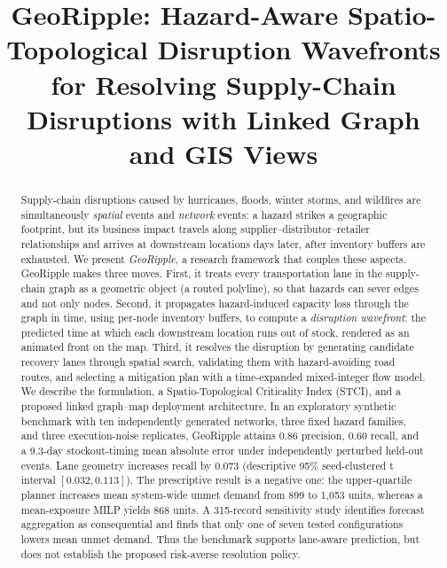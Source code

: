 \documentclass[conference]{IEEEtran}
\begin{document}
\title{GeoRipple: Hazard-Aware Spatio-Topological Disruption Wavefronts
for Resolving Supply-Chain Disruptions with Linked Graph and GIS Views}

\author{}

\maketitle

\begin{abstract}
Supply-chain disruptions caused by hurricanes, floods, winter storms, and
wildfires are simultaneously \emph{spatial} events and \emph{network}
events: a hazard strikes a geographic footprint, but its business impact
travels along supplier--distributor--retailer relationships and arrives at
downstream locations days later, after inventory buffers are exhausted.
We present \emph{GeoRipple}, a research framework that couples these
aspects. GeoRipple makes three moves. First,
it treats every transportation lane in the supply-chain graph as a
geometric object (a routed polyline), so that hazards can sever edges and
not only nodes. Second, it propagates hazard-induced capacity loss through
the graph in time, using per-node inventory buffers, to compute a
\emph{disruption wavefront}: the predicted time at which each downstream
location runs out of stock, rendered as an animated front on the map.
Third, it resolves the disruption by generating candidate recovery lanes
through spatial search, validating them with hazard-avoiding road routes,
and selecting a mitigation plan with a time-expanded mixed-integer flow
model. We describe the formulation, a Spatio-Topological Criticality
Index (STCI), and a proposed linked graph--map deployment architecture.
In an exploratory synthetic benchmark with ten independently generated
networks, three fixed hazard families, and three execution-noise
replicates, GeoRipple attains 0.86 precision, 0.60 recall, and a 9.3-day
stockout-timing mean absolute error under independently perturbed held-out
events. Lane geometry increases recall by 0.073 (descriptive 95\%
seed-clustered t interval $[0.032,0.113]$). The prescriptive result is a
negative one: the upper-quartile planner increases mean system-wide unmet
demand from 899 to 1{,}053 units, whereas a mean-exposure MILP yields 868
units. A 315-record sensitivity study identifies forecast aggregation as
consequential and finds that only one of seven tested configurations lowers
mean unmet demand. Thus the benchmark supports lane-aware prediction, but
does not establish the proposed risk-averse resolution policy.
\end{abstract}
\end{document}
